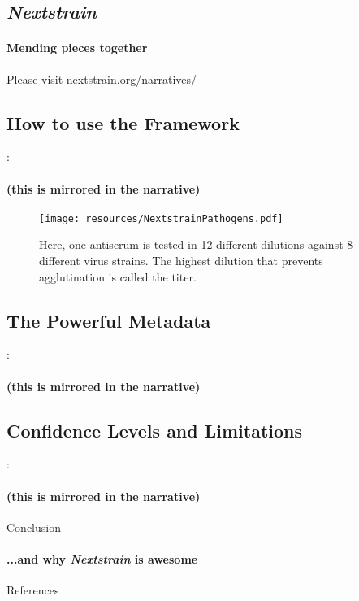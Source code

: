 \documentclass{beamer}
\begin{document}
\begin{darkframes}
  \section{\textit{Nextstrain}}

    \begin{frame}{\secname}
      \framesubtitle{Mending pieces together}
      Please visit nextstrain.org/narratives/
    \end{frame}

    \subsection{How to use the Framework}
    \begin{frame}{\secname : \subsecname}
      \framesubtitle{(this is mirrored in the narrative)}
      \begin{figure}
        \texttt{[image: resources/NextstrainPathogens.pdf]}
        \caption{\footnotesize Here, one antiserum is tested in 12 different dilutions against 8 different virus strains. The highest dilution that prevents agglutination is called the titer.}
      \end{figure}
    \end{frame}

    \subsection{The Powerful Metadata}
    \begin{frame}{\secname : \subsecname}
      \framesubtitle{(this is mirrored in the narrative)}
    \end{frame}

    \subsection{Confidence Levels and Limitations}
    \begin{frame}{\secname : \subsecname}
      \framesubtitle{(this is mirrored in the narrative)}
    \end{frame}

    \begin{frame}{Conclusion}
      \framesubtitle{...and why \textit{Nextstrain} is awesome}
    \end{frame}

    \begin{frame}{References}


    \end{frame}




  \end{darkframes}
\end{document}
